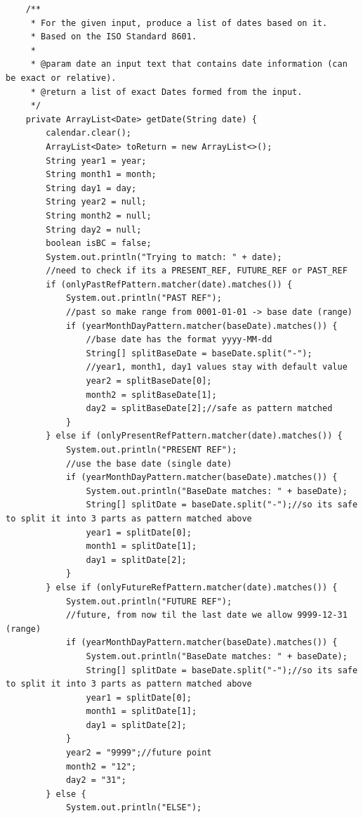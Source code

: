 \begin{lstlisting}
    /**
     * For the given input, produce a list of dates based on it.
     * Based on the ISO Standard 8601.
     *
     * @param date an input text that contains date information (can be exact or relative).
     * @return a list of exact Dates formed from the input.
     */
    private ArrayList<Date> getDate(String date) {
        calendar.clear();
        ArrayList<Date> toReturn = new ArrayList<>();
        String year1 = year;
        String month1 = month;
        String day1 = day;
        String year2 = null;
        String month2 = null;
        String day2 = null;
        boolean isBC = false;
        System.out.println("Trying to match: " + date);
        //need to check if its a PRESENT_REF, FUTURE_REF or PAST_REF
        if (onlyPastRefPattern.matcher(date).matches()) {
            System.out.println("PAST REF");
            //past so make range from 0001-01-01 -> base date (range)
            if (yearMonthDayPattern.matcher(baseDate).matches()) {
                //base date has the format yyyy-MM-dd
                String[] splitBaseDate = baseDate.split("-");
                //year1, month1, day1 values stay with default value
                year2 = splitBaseDate[0];
                month2 = splitBaseDate[1];
                day2 = splitBaseDate[2];//safe as pattern matched
            }
        } else if (onlyPresentRefPattern.matcher(date).matches()) {
            System.out.println("PRESENT REF");
            //use the base date (single date)
            if (yearMonthDayPattern.matcher(baseDate).matches()) {
                System.out.println("BaseDate matches: " + baseDate);
                String[] splitDate = baseDate.split("-");//so its safe to split it into 3 parts as pattern matched above
                year1 = splitDate[0];
                month1 = splitDate[1];
                day1 = splitDate[2];
            }
        } else if (onlyFutureRefPattern.matcher(date).matches()) {
            System.out.println("FUTURE REF");
            //future, from now til the last date we allow 9999-12-31 (range)
            if (yearMonthDayPattern.matcher(baseDate).matches()) {
                System.out.println("BaseDate matches: " + baseDate);
                String[] splitDate = baseDate.split("-");//so its safe to split it into 3 parts as pattern matched above
                year1 = splitDate[0];
                month1 = splitDate[1];
                day1 = splitDate[2];
            }
            year2 = "9999";//future point
            month2 = "12";
            day2 = "31";
        } else {
            System.out.println("ELSE");

\end{lstlisting}
